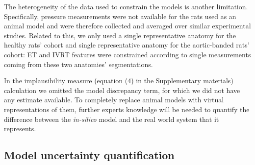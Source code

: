 \vspace{0.2cm}
The heterogeneity of the data used to constrain the models is another limitation. Specifically, pressure measurements were not available for the rats used as an animal model and were therefore collected and averaged over similar experimental studies. Related to this, we only used a single representative anatomy for the healthy rats' cohort and single representative anatomy for the aortic-banded rats' cohort: ET and IVRT features were constrained according to single measurements coming from these two anatomies' segmentations.

\vspace{0.2cm}
In the implausibility measure (equation ($4$) in the Supplementary materials) calculation we omitted the model discrepancy term, for which we did not have any estimate available. To completely replace animal models with virtual representations of them, further experts knowledge will be needed to quantify the difference between the \textit{in-silico} model and the real world system that it represents.


%
%
%
\subsection{Model uncertainty quantification}\label{sec:ch9model_uncertainty_quantification}